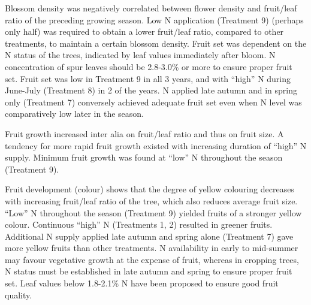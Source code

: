 \vspace{0.5em}
Blossom density was negatively correlated between flower density and fruit/leaf ratio of the preceding growing season. Low N application (Treatment 9) (perhaps only half) was required to obtain a lower fruit/leaf ratio, compared to other treatments, to maintain a certain blossom density.
Fruit set was dependent on the N status of the trees, indicated by leaf values immediately after bloom. N concentration of spur leaves should be 2.8-3.0\% or more to ensure proper fruit set. Fruit set was low in Treatment 9 in all 3 years, and with “high” N during June-July (Treatment 8) in 2 of the years. N applied late autumn and in spring only (Treatment 7) conversely achieved adequate fruit set even when N level was comparatively low later in the season.

\vspace{0.5em}
Fruit growth increased inter alia on fruit/leaf ratio and thus on fruit size. A tendency for more rapid fruit growth existed with increasing duration of “high” N supply. Minimum fruit growth was found at “low” N throughout the season (Treatment 9).

\vspace{0.5em}
Fruit development (colour) shows that the degree of yellow colouring decreases with increasing fruit/leaf ratio of the tree, which also reduces average fruit size. “Low” N throughout the season (Treatment 9) yielded fruits of a stronger yellow colour. Continuous “high” N (Treatments 1, 2) resulted in greener fruits. Additional N supply applied late autumn and spring alone (Treatment 7) gave more yellow fruits than other treatments. N availability in early to mid-summer may favour vegetative growth at the expense of fruit, whereas in cropping trees, N status must be established in late autumn and spring to ensure proper fruit set. Leaf values below 1.8-2.1\% N have been proposed to ensure good fruit quality.


